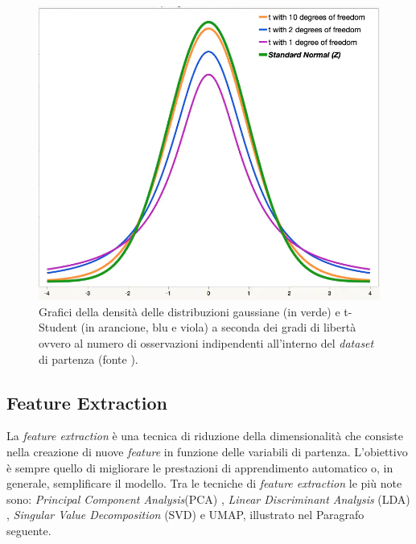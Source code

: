 \documentclass[12pt,italian]{report}
\begin{document}
	
	\begin{figure}
		\centering
		\includegraphics[width=0.65\linewidth]{immagini/t-distribution}
		\caption{Grafici della densità delle distribuzioni gaussiane (in verde) e t-Student (in arancione, blu e viola) a seconda dei gradi di libertà ovvero al numero di osservazioni indipendenti all'interno del \textit{dataset} di partenza (fonte \cite{t-studentFunction}).}
		\label{fig:t-distribution}
	\end{figure}
	
	\subsection{Feature Extraction}
	La \textit{feature extraction} è una tecnica di riduzione della dimensionalità che consiste nella creazione di nuove \textit{feature} in funzione delle variabili di partenza. L'obiettivo è sempre quello di migliorare le prestazioni di apprendimento automatico o, in generale, semplificare il modello. Tra le tecniche di \textit{feature extraction} le più note sono: \textit{Principal Component Analysis}(PCA) \cite{abdi2010principal}, \textit{Linear Discriminant Analysis} (LDA) \cite{balakrishnama1998linear},  \textit{Singular Value Decomposition} (SVD)\cite{abdi2007singular} e UMAP, illustrato nel Paragrafo seguente.
	
	
\end{document}
